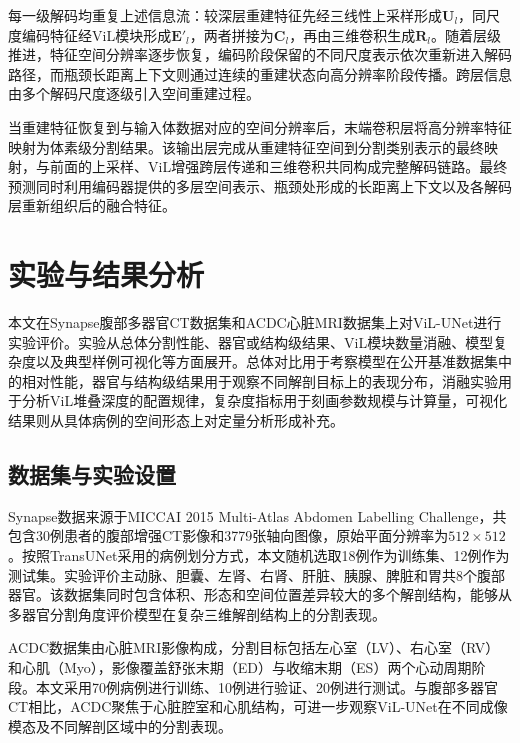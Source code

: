 每一级解码均重复上述信息流：较深层重建特征先经三线性上采样形成\(\mathbf U_l\)，同尺度编码特征经ViL模块形成\(\mathbf E'_l\)，两者拼接为\(\mathbf C_l\)，再由三维卷积生成\(\mathbf R_l\)。随着层级推进，特征空间分辨率逐步恢复，编码阶段保留的不同尺度表示依次重新进入解码路径，而瓶颈长距离上下文则通过连续的重建状态向高分辨率阶段传播。跨层信息由多个解码尺度逐级引入空间重建过程。

当重建特征恢复到与输入体数据对应的空间分辨率后，末端卷积层将高分辨率特征映射为体素级分割结果。该输出层完成从重建特征空间到分割类别表示的最终映射，与前面的上采样、ViL增强跨层传递和三维卷积共同构成完整解码链路。最终预测同时利用编码器提供的多层空间表示、瓶颈处形成的长距离上下文以及各解码层重新组织后的融合特征。


\section{实验与结果分析}

本文在Synapse腹部多器官CT数据集和ACDC心脏MRI数据集上对ViL-UNet进行实验评价。实验从总体分割性能、器官或结构级结果、ViL模块数量消融、模型复杂度以及典型样例可视化等方面展开。总体对比用于考察模型在公开基准数据集中的相对性能，器官与结构级结果用于观察不同解剖目标上的表现分布，消融实验用于分析ViL堆叠深度的配置规律，复杂度指标用于刻画参数规模与计算量，可视化结果则从具体病例的空间形态上对定量分析形成补充。

\subsection{数据集与实验设置}

Synapse数据来源于MICCAI 2015 Multi-Atlas Abdomen Labelling Challenge，共包含30例患者的腹部增强CT影像和3779张轴向图像，原始平面分辨率为\(512\times512\)。按照TransUNet采用的病例划分方式\cite{chen2024transunet}，本文随机选取18例作为训练集、12例作为测试集。实验评价主动脉、胆囊、左肾、右肾、肝脏、胰腺、脾脏和胃共8个腹部器官。该数据集同时包含体积、形态和空间位置差异较大的多个解剖结构，能够从多器官分割角度评价模型在复杂三维解剖结构上的分割表现。

ACDC数据集由心脏MRI影像构成，分割目标包括左心室（LV）、右心室（RV）和心肌（Myo），影像覆盖舒张末期（ED）与收缩末期（ES）两个心动周期阶段。本文采用70例病例进行训练、10例进行验证、20例进行测试。与腹部多器官CT相比，ACDC聚焦于心脏腔室和心肌结构，可进一步观察ViL-UNet在不同成像模态及不同解剖区域中的分割表现。


